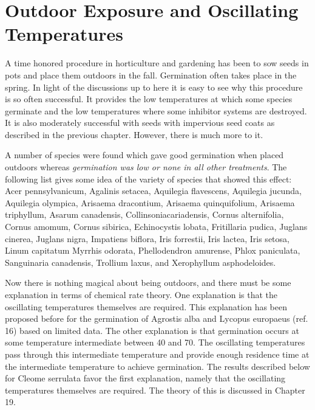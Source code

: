 \chapter{Outdoor Exposure and Oscillating Temperatures}

A time honored procedure in horticulture and gardening has been to sow seeds
in pots and place them outdoors in the fall. Germination often takes place in the
spring. In light of the discussions up to here it is easy to see why this procedure is so
often successful. It provides the low temperatures at which some species germinate
and the low temperatures where some inhibitor systems are destroyed. It is also
moderately successful with seeds with impervious seed coats as described in the
previous chapter. However, there is much more to it.

A number of species were found which gave good germination when placed
outdoors whereas \textit{germination was low or none in all other treatments}. The following
list gives some idea of the variety of species that showed this effect: Acer
pennsylvanicum, Agalinis setacea, Aquilegia flavescens, Aquilegia jucunda, Aquilegia
olympica, Arisaema dracontium, Arisaema quinquifolium, Arisaema triphyllum, Asarum
canadensis, Collinsoniacariadensis, Cornus alternifolia, Cornus amomum, Cornus
sibirica, Echinocystis lobata, Fritillaria pudica, Juglans cinerea, Juglans nigra,
Impatiens biflora, Iris forrestii, Iris lactea, Iris setosa, Linum capitatum Myrrhis odorata,
Phellodendron amurense, Phlox paniculata, Sanguinaria canadensis, Trollium laxus,
and Xerophyllum asphodeloides.

Now there is nothing magical about being outdoors, and there must be some
explanation in terms of chemical rate theory. One explanation is that the oscillating
temperatures themselves are required. This explanation has been proposed before
for the germination of Agrostis alba and Lycopus europaeus (ref. 16) based on limited
data. The other explanation is that germination occurs at some temperature
intermediate between 40 and 70. The oscillating temperatures pass through this
intermediate temperature and provide enough residence time at the intermediate
temperature to achieve germination. The results described below for Cleome
serrulata favor the first explanation, namely that the oscillating temperatures
themselves are required. The theory of this is discussed in Chapter 19.

